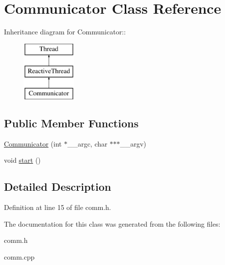 \hypertarget{classCommunicator}{
\section{Communicator Class Reference}
\label{classCommunicator}
}
Inheritance diagram for Communicator::\begin{figure}[H]
\begin{center}
\leavevmode
\includegraphics[height=3cm]{classCommunicator}
\end{center}
\end{figure}
\subsection*{Public Member Functions}
\begin{CompactItemize}
\item 
\hypertarget{classCommunicator_7c9dce4ea92bd04d01d53f80c0ef08ee}{
\hyperlink{classCommunicator_7c9dce4ea92bd04d01d53f80c0ef08ee}{Communicator} (int $\ast$\_\-\_\-argc, char $\ast$$\ast$$\ast$\_\-\_\-argv)}
\label{classCommunicator_7c9dce4ea92bd04d01d53f80c0ef08ee}

\item 
\hypertarget{classCommunicator_142fae13b16b166519315f248a513c62}{
void \hyperlink{classCommunicator_142fae13b16b166519315f248a513c62}{start} ()}
\label{classCommunicator_142fae13b16b166519315f248a513c62}

\end{CompactItemize}


\subsection{Detailed Description}




Definition at line 15 of file comm.h.

The documentation for this class was generated from the following files:\begin{CompactItemize}
\item 
comm.h\item 
comm.cpp\end{CompactItemize}
